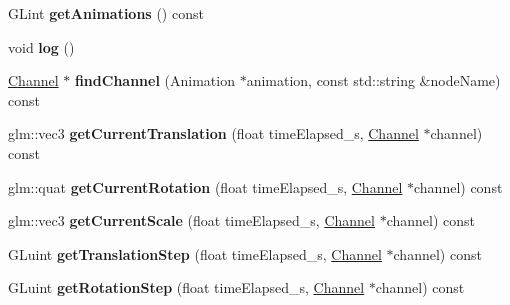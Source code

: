 \begin{DoxyCompactItemize}
\item 
G\+Lint {\bfseries get\+Animations} () const \hypertarget{classflw_1_1flf_1_1Animator_a06c6267d87e4235c5a6ab4646c46ff33}{}\label{classflw_1_1flf_1_1Animator_a06c6267d87e4235c5a6ab4646c46ff33}

\item 
void {\bfseries log} ()\hypertarget{classflw_1_1flf_1_1Animator_a24c60b9bc99325b4ae3e472fef9651c8}{}\label{classflw_1_1flf_1_1Animator_a24c60b9bc99325b4ae3e472fef9651c8}

\item 
\hyperlink{classflw_1_1flf_1_1Channel}{Channel} $\ast$ {\bfseries find\+Channel} (Animation $\ast$animation, const std\+::string \&node\+Name) const \hypertarget{classflw_1_1flf_1_1Animator_adfdac3418123577c5713f5ccc2921c48}{}\label{classflw_1_1flf_1_1Animator_adfdac3418123577c5713f5ccc2921c48}

\item 
glm\+::vec3 {\bfseries get\+Current\+Translation} (float time\+Elapsed\+\_\+s, \hyperlink{classflw_1_1flf_1_1Channel}{Channel} $\ast$channel) const \hypertarget{classflw_1_1flf_1_1Animator_a4122056169660638aa6fd70c11ac7e44}{}\label{classflw_1_1flf_1_1Animator_a4122056169660638aa6fd70c11ac7e44}

\item 
glm\+::quat {\bfseries get\+Current\+Rotation} (float time\+Elapsed\+\_\+s, \hyperlink{classflw_1_1flf_1_1Channel}{Channel} $\ast$channel) const \hypertarget{classflw_1_1flf_1_1Animator_a5ca43958bcf99fa67cb1de1926b47c68}{}\label{classflw_1_1flf_1_1Animator_a5ca43958bcf99fa67cb1de1926b47c68}

\item 
glm\+::vec3 {\bfseries get\+Current\+Scale} (float time\+Elapsed\+\_\+s, \hyperlink{classflw_1_1flf_1_1Channel}{Channel} $\ast$channel) const \hypertarget{classflw_1_1flf_1_1Animator_a0ec54b5040efb127bbb56505cb7bab74}{}\label{classflw_1_1flf_1_1Animator_a0ec54b5040efb127bbb56505cb7bab74}

\item 
G\+Luint {\bfseries get\+Translation\+Step} (float time\+Elapsed\+\_\+s, \hyperlink{classflw_1_1flf_1_1Channel}{Channel} $\ast$channel) const \hypertarget{classflw_1_1flf_1_1Animator_a63c8f570ed1777a11110bc344291e242}{}\label{classflw_1_1flf_1_1Animator_a63c8f570ed1777a11110bc344291e242}

\item 
G\+Luint {\bfseries get\+Rotation\+Step} (float time\+Elapsed\+\_\+s, \hyperlink{classflw_1_1flf_1_1Channel}{Channel} $\ast$channel) const \hypertarget{classflw_1_1flf_1_1Animator_af36f09d9999f6d6aabebe4b1573681ca}{}\label{classflw_1_1flf_1_1Animator_af36f09d9999f6d6aabebe4b1573681ca}


\end{DoxyCompactItemize}
